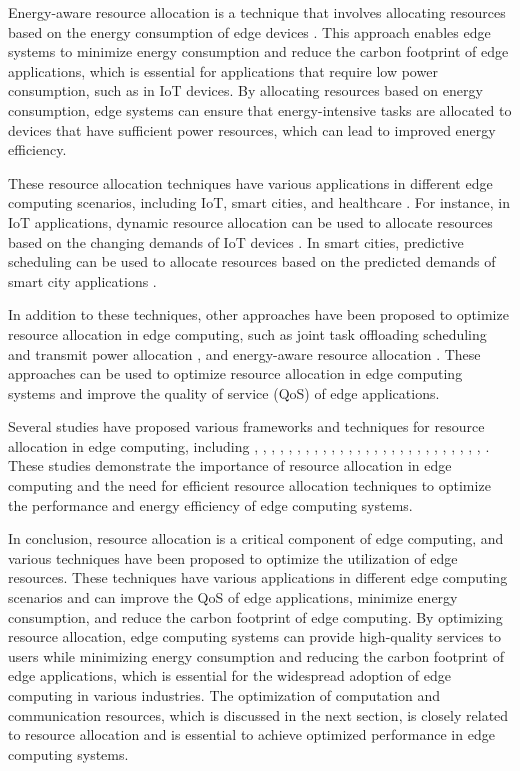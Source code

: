 \documentclass[11pt]{article}
\begin{document}
Energy-aware resource allocation is a technique that involves allocating resources based on the energy consumption of edge devices \cite{ref120}. This approach enables edge systems to minimize energy consumption and reduce the carbon footprint of edge applications, which is essential for applications that require low power consumption, such as in IoT devices. By allocating resources based on energy consumption, edge systems can ensure that energy-intensive tasks are allocated to devices that have sufficient power resources, which can lead to improved energy efficiency.

These resource allocation techniques have various applications in different edge computing scenarios, including IoT, smart cities, and healthcare \cite{ref67}. For instance, in IoT applications, dynamic resource allocation can be used to allocate resources based on the changing demands of IoT devices \cite{ref121}. In smart cities, predictive scheduling can be used to allocate resources based on the predicted demands of smart city applications \cite{ref122}.

In addition to these techniques, other approaches have been proposed to optimize resource allocation in edge computing, such as joint task offloading scheduling and transmit power allocation \cite{ref123}, and energy-aware resource allocation \cite{ref124}. These approaches can be used to optimize resource allocation in edge computing systems and improve the quality of service (QoS) of edge applications.

Several studies have proposed various frameworks and techniques for resource allocation in edge computing, including \cite{ref125}, \cite{ref126}, \cite{ref127}, \cite{ref128}, \cite{ref129}, \cite{ref130}, \cite{ref131}, \cite{ref132}, \cite{ref133}, \cite{ref134}, \cite{ref135}, \cite{ref136}, \cite{ref137}, \cite{ref138}, \cite{ref139}, \cite{ref140}, \cite{ref141}, \cite{ref142}, \cite{ref143}, \cite{ref144}, \cite{ref145}, \cite{ref146}, \cite{ref147}, \cite{ref148}, \cite{ref149}, \cite{ref150}, \cite{ref151}, \cite{ref152}. These studies demonstrate the importance of resource allocation in edge computing and the need for efficient resource allocation techniques to optimize the performance and energy efficiency of edge computing systems.

In conclusion, resource allocation is a critical component of edge computing, and various techniques have been proposed to optimize the utilization of edge resources. These techniques have various applications in different edge computing scenarios and can improve the QoS of edge applications, minimize energy consumption, and reduce the carbon footprint of edge computing. By optimizing resource allocation, edge computing systems can provide high-quality services to users while minimizing energy consumption and reducing the carbon footprint of edge applications, which is essential for the widespread adoption of edge computing in various industries. The optimization of computation and communication resources, which is discussed in the next section, is closely related to resource allocation and is essential to achieve optimized performance in edge computing systems.
\end{document}

